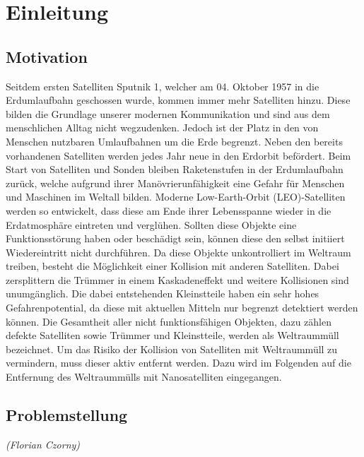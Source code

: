 \chapter{Einleitung}
		\section{Motivation}
		
Seitdem ersten Satelliten Sputnik \num{1}, welcher am 04. Oktober 1957 in die Erdumlaufbahn geschossen wurde, kommen immer mehr Satelliten hinzu. Diese bilden die Grundlage unserer modernen Kommunikation und sind aus dem menschlichen Alltag nicht wegzudenken. Jedoch ist der Platz in den von Menschen nutzbaren Umlaufbahnen um die Erde begrenzt. Neben den bereits vorhandenen Satelliten werden jedes Jahr neue in den Erdorbit befördert. Beim Start von Satelliten und Sonden bleiben Raketenstufen in der Erdumlaufbahn zurück, welche aufgrund ihrer Manövrierunfähigkeit eine Gefahr für Menschen und Maschinen im Weltall bilden. Moderne Low-Earth-Orbit (LEO)-Satelliten werden so entwickelt, dass diese am Ende ihrer Lebensspanne wieder in die Erdatmosphäre eintreten und verglühen. Sollten diese Objekte eine Funktionsstörung haben oder beschädigt sein, können diese den selbst initiiert Wiedereintritt nicht durchführen. Da diese Objekte unkontrolliert im Weltraum treiben, besteht die Möglichkeit einer Kollision mit anderen Satelliten. Dabei zersplittern die Trümmer in einem Kaskadeneffekt und weitere Kollisionen sind unumgänglich. Die dabei entstehenden Kleinstteile haben ein sehr hohes Gefahrenpotential, da diese mit aktuellen Mitteln nur begrenzt detektiert werden können. Die Gesamtheit aller nicht funktionsfähigen Objekten, dazu zählen defekte Satelliten sowie Trümmer und Kleinstteile, werden als Weltraummüll bezeichnet. Um das Risiko der Kollision von Satelliten mit Weltraummüll zu vermindern, muss dieser aktiv entfernt werden. Dazu wird im Folgenden auf die Entfernung des Weltraummülls mit Nanosatelliten eingegangen.

		\section{Problemstellung}
		\hfill\emph{(Florian Czorny)}\\
		
